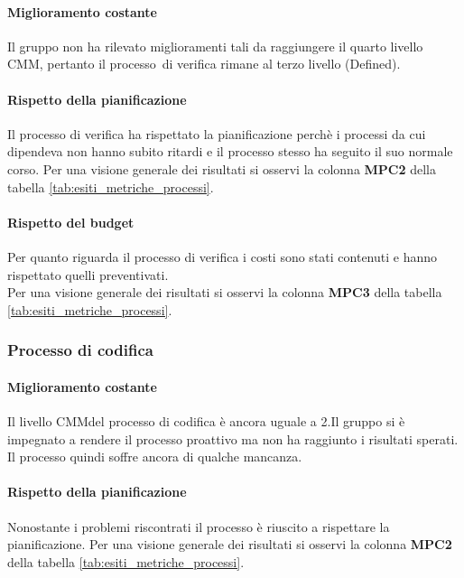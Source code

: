 \documentclass[../PianoDiQualifica.tex]{subfiles}
\begin{document}
\begin{appendices}
			\paragraph{Miglioramento costante}
			Il gruppo non ha rilevato miglioramenti tali da raggiungere il quarto livello CMM\g, pertanto il processo\g\ di verifica rimane al terzo livello (Defined).
			
			\paragraph{Rispetto della pianificazione}
			Il processo di verifica ha rispettato la pianificazione perchè i processi da cui dipendeva non hanno subito ritardi e il processo stesso ha seguito il suo normale corso.
			Per una visione generale dei risultati si osservi la colonna \textbf{MPC2}  della tabella \ref{tab:esiti_metriche_processi}.
			
			\paragraph{Rispetto del budget}
			Per quanto riguarda il processo di verifica i costi sono stati contenuti e hanno rispettato quelli preventivati.\\
			Per una visione generale dei risultati si osservi la colonna \textbf{MPC3}  della tabella \ref{tab:esiti_metriche_processi}.
	
		\subsubsection{Processo di codifica}
			\paragraph{Miglioramento costante}
			Il livello CMM\g del processo di codifica è ancora uguale a 2.Il gruppo si è impegnato a rendere il processo proattivo ma non ha raggiunto i risultati sperati. Il processo quindi soffre ancora di qualche mancanza.\\
			
			\paragraph{Rispetto della pianificazione}
			Nonostante i problemi riscontrati il processo è riuscito a rispettare la pianificazione.
			Per una visione generale dei risultati si osservi la colonna \textbf{MPC2}  della tabella \ref{tab:esiti_metriche_processi}.
			

\end{appendices}
\end{document}
